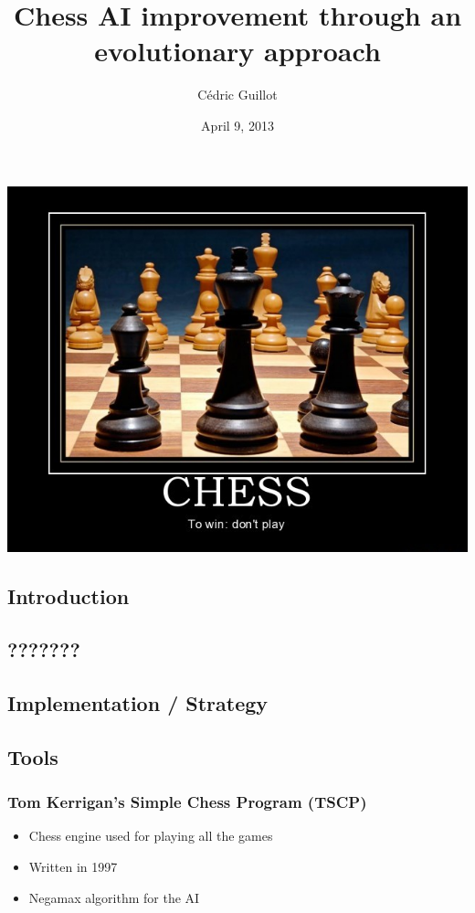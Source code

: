 \documentclass{beamer}
\author{Cédric Guillot}
\institute{CPSC 565}
\title{Chess AI improvement through an evolutionary approach}
\date{April 9, 2013}
\begin{document}
\begin{frame}
\titlepage
\end{frame}

\begin{frame}
\begin{center}
\includegraphics[scale=0.47]{images/to_win_dont_play.jpg}
\end{center}
\end{frame}

\begin{frame}
\tableofcontents
\end{frame}

\begin{frame}
\section{Introduction}
\subsection{???????}
\end{frame}

\begin{frame}
\section{Implementation / Strategy}
\subsection{Tools}
\frametitle{Tom Kerrigan's Simple Chess Program (TSCP)}
\begin{itemize}
\item Chess engine used for playing all the games
\item Written in 1997
\item Negamax algorithm for the AI
\end{itemize}
\end{frame}
\end{document}
